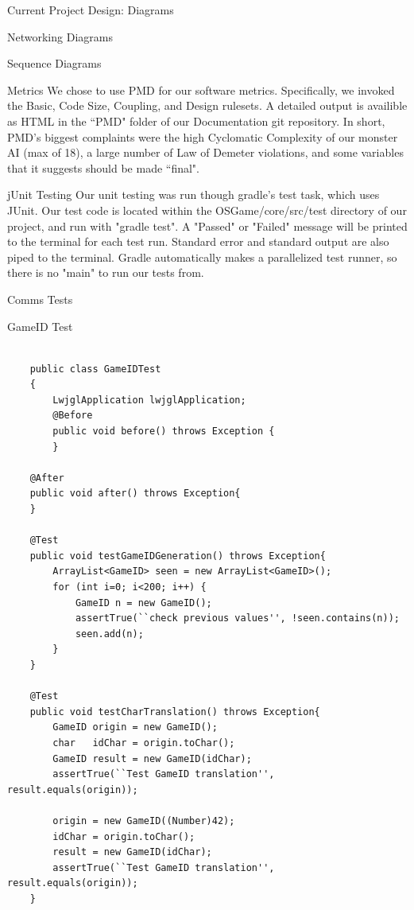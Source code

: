 \documentclass[12pt]{report}
\begin{document}
\begin{chapter}{Current Project Design: Diagrams}
\begin{section}{Networking Diagrams}
\begin{subsection}{Sequence Diagrams}
	\end{subsection}
   \end{section}
 \end{chapter}
 
  \begin{chapter}{Metrics}
  	We chose to use PMD for our software metrics. Specifically, we invoked the Basic, Code Size, Coupling, and Design rulesets. A detailed output is availible as HTML in the ``PMD" folder of our Documentation git repository. In short, PMD's biggest complaints were the high Cyclomatic Complexity of our monster AI (max of 18), a large number of Law of Demeter violations, and some variables that it suggests should be made ``final".
  \end{chapter}
 
 
 \begin{chapter}{jUnit Testing}
 	Our unit testing was run though gradle's test task, which uses JUnit. Our test code is located within the OSGame/core/src/test directory of our project, and run with "gradle test". A "Passed" or "Failed" message will be printed to the terminal for each test run. Standard error and standard output are also piped to the terminal. Gradle automatically makes a parallelized test runner, so there is no "main" to run our tests from.
 	
  \begin{section}{Comms Tests}
   \begin{subsection}{GameID Test}
    \begin{lstlisting}

    public class GameIDTest
    {
    	LwjglApplication lwjglApplication;
    	@Before
    	public void before() throws Exception {
    	}

    @After
    public void after() throws Exception{
    }

    @Test
    public void testGameIDGeneration() throws Exception{
        ArrayList<GameID> seen = new ArrayList<GameID>();
        for (int i=0; i<200; i++) {
            GameID n = new GameID();
            assertTrue(``check previous values'', !seen.contains(n));
            seen.add(n);
        }
    }

    @Test
    public void testCharTranslation() throws Exception{
        GameID origin = new GameID();
        char   idChar = origin.toChar();
        GameID result = new GameID(idChar);
        assertTrue(``Test GameID translation'', result.equals(origin));

        origin = new GameID((Number)42);
        idChar = origin.toChar();
        result = new GameID(idChar);
        assertTrue(``Test GameID translation'', result.equals(origin));
    }



\end{lstlisting}
\end{subsection}
\end{section}
\end{chapter}
\end{document}
